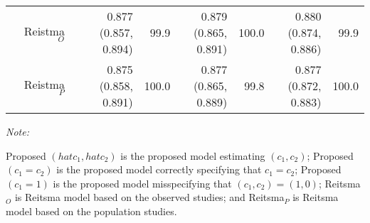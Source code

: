 \begin{table}
\begin{threeparttable}
\begin{tabular}[t]{rrrrrrrrr}
 & Reistma$_O$ &  & 0.877 (0.857, 0.894) & 99.9 & 0.879 (0.865, 0.891) & 100.0 & 0.880 (0.874, 0.886) & 99.9\\
 & Reistma$_P$ &  & 0.875 (0.858, 0.891) & 100.0 & 0.877 (0.865, 0.889) & 99.8 & 0.877 (0.872, 0.883) & 100.0\\
\bottomrule
\end{tabular}
\begin{tablenotes}
\item \textit{Note: } 
\item Proposed $({hat{c}_1, hat{c}_2})$ is the proposed model estimating $(c_1, c_2)$;
   Proposed $(c_1 = c_2)$ is the proposed model correctly specifying that $c_1=c_2$;
   Proposed $(c_1 = 1)$ is the proposed model misspecifying that $(c_1, c_2) = (1,0)$;
   Reitsma$_O$ is Reitsma model based on the observed studies;
   and Reitsma$_P$ is Reitsma model based on the population studies.
\end{tablenotes}
\end{threeparttable}
\end{table}
